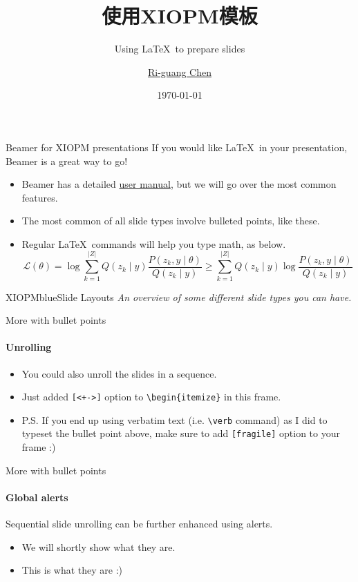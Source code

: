 \documentclass{beamer}
\title{使用XIOPM模板}
\subtitle{Using \LaTeX\ to prepare slides}
\author{\href{870408605@qq.com}{Ri-guang Chen}}
\date{\today}
\newcommand{\hrefcol}[2]{\textcolor{uihteal}{\href{#1}{#2}}}
\begin{document}
\maketitle


\begin{frame}{Beamer for XIOPM presentations}
If you would like \LaTeX\ in your presentation, Beamer is a great way to go!
\begin{itemize}
\item Beamer has a detailed
\hrefcol{https://www.ctan.org/tex-archive/macros/latex/contrib/beamer/doc/beameruserguide.pdf}{user
 manual}, but we will go over the most common features.
\item The most common of all slide types involve bulleted points, like these.
\item Regular \LaTeX\ commands will help you type math, as below.
\begin{equation*}
\mathcal{L} (\theta) = \log \sum_{k=1}^{\lvert Z \rvert} Q(z_k \mid y) \frac{P( z_k,  y \mid \theta)}{Q(z_k \mid y)} \geq \sum_{k=1}^{\lvert Z \rvert} Q(z_k \mid y) \log \frac{P( z_k,  y \mid \theta)}{Q(z_k \mid y)}
\end{equation*}
\end{itemize}
\end{frame}


\begin{chapter}{XIOPMblue}{Slide Layouts}
\textit{An overview of some different slide types you can have.}
\end{chapter}


\begin{frame}[fragile]{More with bullet points}
\framesubtitle{Unrolling}
\begin{itemize}[<+->]
\item You could also unroll the slides in a sequence.
\item Just added \verb|[<+->]| option to \verb|\begin{itemize}| in this frame.
\item P.S. If you end up using verbatim text (i.e. \verb|\verb| command) as I did to typeset the bullet point above, make sure to add \verb|[fragile]| option to your frame :)
\end{itemize}
\end{frame}


\begin{frame}[fragile]{More with bullet points}
\framesubtitle{Global alerts}
Sequential slide unrolling can be further enhanced using alerts.
\begin{itemize}[<alert@2>]
\item We will shortly show what they are.
\item<2- | alert@2> This is what they are :)
\end{itemize}
\end{frame}
\end{document}
